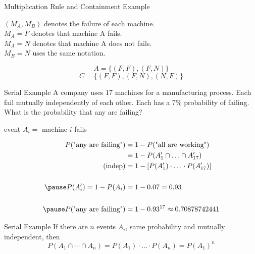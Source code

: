\documentclass[handout]{beamer}
\begin{document}
\begin{frame}{Multiplication Rule and Containment Example}
    \begin{center}
    $(M_A,M_B)$ denotes the failure of each machine.\\
    $M_A=F$ denotes that machine A fails.\\
    $M_A=N$ denotes that machine A does not fails.\\
    $M_B=N$ uses the same notation.\\
    \end{center}
    $$A = \{(F,F),(F,N)\}$$
    $$C = \{(F,F),(F,N),(N,F)\}$$
\end{frame}

\begin{frame}{Serial Example}
    A company uses 17 machines for a manufacturing process. Each fail mutually independently of each other. Each has a 7\% probability of failing. What is the probability that any are failing?
    \begin{center}
        event $A_{i} = $ machine $i$ fails
    \end{center}
    \begin{align*}
        P(\text{"any are failing"}) &= 1-P(\text{"all are working"}) \\
        &= 1-P(A_1' \cap \ldots \cap A_{17}') \\
        (\text{indep})&= 1-[P(A_1') \cdot \ldots \cdot P(A_{17}')] \\
        & \\
        \pause P(A_i') = 1 - P(A_i) & = 1 - 0.07 = 0.93 \\
        & \\
        \pause P(\text{"any are failing"}) & = 1 - 0.93^{17} \approx 0.70878742441
    \end{align*}
\end{frame}

\begin{frame}{Serial Example}
    If there are $n$ events $A_i$, same probability and mutually independent, then
    \[P(A_1 \cap \cdots \cap A_{n}) = P(A_1) \cdot \ldots \cdot P(A_n) = P(A_1)^n\]
\end{frame}
\end{document}
